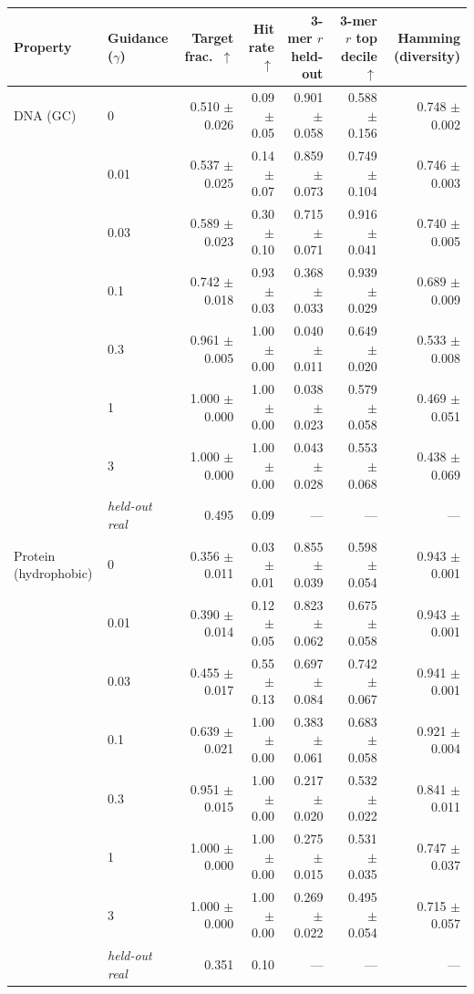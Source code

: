 \begin{tabular}{llrrrrr}
\toprule
Property & Guidance ($\gamma$) & Target frac.\ $\uparrow$ & Hit rate $\uparrow$ & 3-mer $r$ held-out & 3-mer $r$ top decile $\uparrow$ & Hamming (diversity) \\
\midrule
DNA (GC) & 0 & 0.510 $\pm$ 0.026 & 0.09 $\pm$ 0.05 & 0.901 $\pm$ 0.058 & 0.588 $\pm$ 0.156 & 0.748 $\pm$ 0.002 \\
 & 0.01 & 0.537 $\pm$ 0.025 & 0.14 $\pm$ 0.07 & 0.859 $\pm$ 0.073 & 0.749 $\pm$ 0.104 & 0.746 $\pm$ 0.003 \\
 & 0.03 & 0.589 $\pm$ 0.023 & 0.30 $\pm$ 0.10 & 0.715 $\pm$ 0.071 & 0.916 $\pm$ 0.041 & 0.740 $\pm$ 0.005 \\
 & 0.1 & 0.742 $\pm$ 0.018 & 0.93 $\pm$ 0.03 & 0.368 $\pm$ 0.033 & 0.939 $\pm$ 0.029 & 0.689 $\pm$ 0.009 \\
 & 0.3 & 0.961 $\pm$ 0.005 & 1.00 $\pm$ 0.00 & 0.040 $\pm$ 0.011 & 0.649 $\pm$ 0.020 & 0.533 $\pm$ 0.008 \\
 & 1 & 1.000 $\pm$ 0.000 & 1.00 $\pm$ 0.00 & 0.038 $\pm$ 0.023 & 0.579 $\pm$ 0.058 & 0.469 $\pm$ 0.051 \\
 & 3 & 1.000 $\pm$ 0.000 & 1.00 $\pm$ 0.00 & 0.043 $\pm$ 0.028 & 0.553 $\pm$ 0.068 & 0.438 $\pm$ 0.069 \\
 & \emph{held-out real} & 0.495 & 0.09 & --- & --- & --- \\
\midrule
Protein (hydrophobic) & 0 & 0.356 $\pm$ 0.011 & 0.03 $\pm$ 0.01 & 0.855 $\pm$ 0.039 & 0.598 $\pm$ 0.054 & 0.943 $\pm$ 0.001 \\
 & 0.01 & 0.390 $\pm$ 0.014 & 0.12 $\pm$ 0.05 & 0.823 $\pm$ 0.062 & 0.675 $\pm$ 0.058 & 0.943 $\pm$ 0.001 \\
 & 0.03 & 0.455 $\pm$ 0.017 & 0.55 $\pm$ 0.13 & 0.697 $\pm$ 0.084 & 0.742 $\pm$ 0.067 & 0.941 $\pm$ 0.001 \\
 & 0.1 & 0.639 $\pm$ 0.021 & 1.00 $\pm$ 0.00 & 0.383 $\pm$ 0.061 & 0.683 $\pm$ 0.058 & 0.921 $\pm$ 0.004 \\
 & 0.3 & 0.951 $\pm$ 0.015 & 1.00 $\pm$ 0.00 & 0.217 $\pm$ 0.020 & 0.532 $\pm$ 0.022 & 0.841 $\pm$ 0.011 \\
 & 1 & 1.000 $\pm$ 0.000 & 1.00 $\pm$ 0.00 & 0.275 $\pm$ 0.015 & 0.531 $\pm$ 0.035 & 0.747 $\pm$ 0.037 \\
 & 3 & 1.000 $\pm$ 0.000 & 1.00 $\pm$ 0.00 & 0.269 $\pm$ 0.022 & 0.495 $\pm$ 0.054 & 0.715 $\pm$ 0.057 \\
 & \emph{held-out real} & 0.351 & 0.10 & --- & --- & --- \\
\bottomrule
\end{tabular}